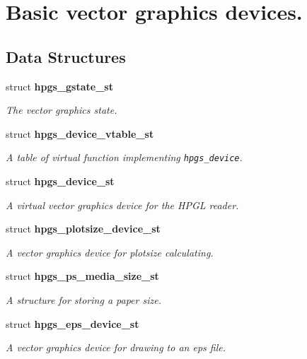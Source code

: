 \section{Basic vector graphics devices.}
\label{group__device}
\subsection*{Data Structures}
\begin{CompactItemize}
\item 
struct {\bf hpgs\_\-gstate\_\-st}
\begin{CompactList}\small\item\em The vector graphics state. \item\end{CompactList}\item 
struct {\bf hpgs\_\-device\_\-vtable\_\-st}
\begin{CompactList}\small\item\em A table of virtual function implementing {\tt hpgs\_\-device}. \item\end{CompactList}\item 
struct {\bf hpgs\_\-device\_\-st}
\begin{CompactList}\small\item\em A virtual vector graphics device for the HPGL reader. \item\end{CompactList}\item 
struct {\bf hpgs\_\-plotsize\_\-device\_\-st}
\begin{CompactList}\small\item\em A vector graphics device for plotsize calculating. \item\end{CompactList}\item 
struct {\bf hpgs\_\-ps\_\-media\_\-size\_\-st}
\begin{CompactList}\small\item\em A structure for storing a paper size. \item\end{CompactList}\item 
struct {\bf hpgs\_\-eps\_\-device\_\-st}
\begin{CompactList}\small\item\em A vector graphics device for drawing to an eps file. \item\end{CompactList}\end{CompactItemize}
